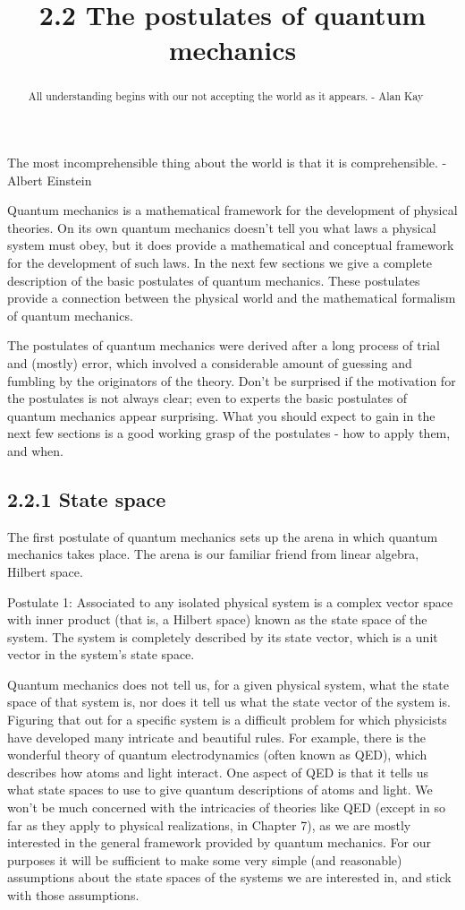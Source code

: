 \documentclass[10pt]{article}
\title{2.2 The postulates of quantum mechanics }
\author{}
\date{}
\begin{document}
\maketitle
\begin{abstract}
All understanding begins with our not accepting the world as it appears. - Alan Kay
\end{abstract}

The most incomprehensible thing about the world is that it is comprehensible. - Albert Einstein

Quantum mechanics is a mathematical framework for the development of physical theories. On its own quantum mechanics doesn't tell you what laws a physical system must obey, but it does provide a mathematical and conceptual framework for the development of such laws. In the next few sections we give a complete description of the basic postulates of quantum mechanics. These postulates provide a connection between the physical world and the mathematical formalism of quantum mechanics.

The postulates of quantum mechanics were derived after a long process of trial and (mostly) error, which involved a considerable amount of guessing and fumbling by the originators of the theory. Don't be surprised if the motivation for the postulates is not always clear; even to experts the basic postulates of quantum mechanics appear surprising. What you should expect to gain in the next few sections is a good working grasp of the postulates - how to apply them, and when.

\subsection*{2.2.1 State space}
The first postulate of quantum mechanics sets up the arena in which quantum mechanics takes place. The arena is our familiar friend from linear algebra, Hilbert space.

Postulate 1: Associated to any isolated physical system is a complex vector space with inner product (that is, a Hilbert space) known as the state space of the system. The system is completely described by its state vector, which is a unit vector in the system's state space.

Quantum mechanics does not tell us, for a given physical system, what the state space of that system is, nor does it tell us what the state vector of the system is. Figuring that out for a specific system is a difficult problem for which physicists have developed many intricate and beautiful rules. For example, there is the wonderful theory of quantum electrodynamics (often known as QED), which describes how atoms and light interact. One aspect of QED is that it tells us what state spaces to use to give quantum descriptions of atoms and light. We won't be much concerned with the intricacies of theories like QED (except in so far as they apply to physical realizations, in Chapter 7), as we are mostly interested in the general framework provided by quantum mechanics. For our purposes it will be sufficient to make some very simple (and reasonable) assumptions about the state spaces of the systems we are interested in, and stick with those assumptions.
\end{document}
